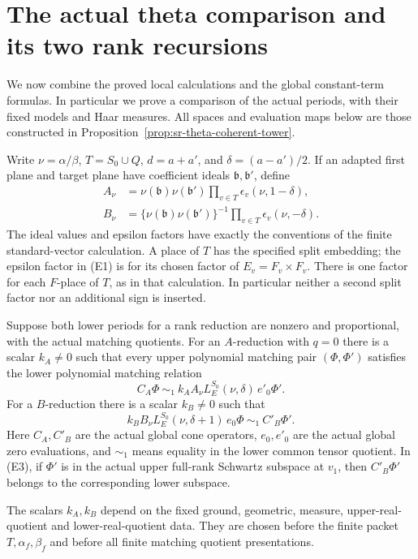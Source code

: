 
\section{The actual theta comparison and its two rank recursions}
\label{sec:sr-theta-comparison-endgame}

We now combine the proved local calculations and the global
constant-term formulas. In particular we prove a comparison of the
actual periods, with their fixed models and Haar measures.
All spaces and evaluation maps below are those constructed in
Proposition~\ref{prop:sr-theta-coherent-tower}.

Write \(\nu=\alpha/\beta\), \(T=S_0\cup Q\), \(d=a+a'\), and
\(\delta=(a-a')/2\). If an adapted first plane and target plane
have coefficient ideals \(\mathfrak b,\mathfrak b'\), define
\[
 \begin{split}
 A_\nu&=\nu(\mathfrak b)\nu(\mathfrak b')
       \prod_{v\in T}\epsilon_v(\nu,1-\delta),\\
 B_\nu&=\{\nu(\mathfrak b)\nu(\mathfrak b')\}^{-1}
       \prod_{v\in T}\epsilon_v(\nu,-\delta).
 \end{split}                                      \tag{E1}
 \label{eq:sr-theta-two-step-factors}
\]
The ideal values and epsilon factors have exactly the conventions
of the finite standard-vector calculation. A place of \(T\)
has the specified split embedding; the epsilon factor in (E1)
is for its chosen factor of \(E_v=F_v\times F_v\).
There is one factor for each \(F\)-place of \(T\), as in that
calculation. In particular neither a second split factor nor
an additional sign is inserted.

\begin{srlemma}
\label{lem:sr-theta-actual-lower-comparison}
Suppose both lower periods for a rank reduction are nonzero and
proportional, with the actual matching quotients.
For an \(A\)-reduction with \(q=0\) there is a scalar
\(k_A\ne0\) such that every upper polynomial matching pair
\((\Phi,\Phi')\) satisfies the lower polynomial matching relation
\[
     C_A\Phi
       \ \sim_1\
       k_A A_\nu L^{S_0}_E(\nu,\delta)\,e'_0\Phi'.
 \tag{E2}\label{eq:sr-theta-actual-LocA}
\]
For a \(B\)-reduction there is a scalar \(k_B\ne0\) such that
\[
   k_B B_\nu L^{S_0}_E(\nu,\delta+1)\,e_0\Phi
                  \ \sim_1\ C'_B\Phi'.           \tag{E3}
 \label{eq:sr-theta-actual-LocB}
\]
Here \(C_A,C'_B\) are the actual global cone operators,
\(e_0,e'_0\) are the actual global zero evaluations, and
\(\sim_1\) means equality in the lower common tensor quotient.
In (E3), if \(\Phi'\) is in the actual upper full-rank
Schwartz subspace at \(v_1\), then \(C'_B\Phi'\) belongs
to the corresponding lower subspace.

The scalars \(k_A,k_B\) depend on the fixed ground, geometric,
measure, upper-real-quotient and lower-real-quotient data.
They are chosen before the finite packet \(T,\alpha_f,\beta_f\)
and before all finite matching quotient presentations.
\end{srlemma}

